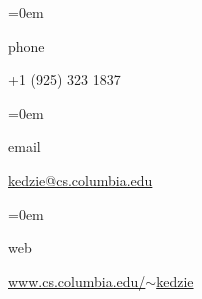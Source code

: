\documentclass{scrartcl}
\newcommand{\NewEntry}[2]{\noindent\hangindent=0em\hangafter=0 \parbox{4em}{\small #1} #2 
\vspace{0.35em}} %
\begin{document}
\thispagestyle{empty} %


\begin{cv}{}\vspace{0.5em} %

\noindent{}\vspace{0.5em} 

\NewEntry{phone}{+1 (925) 323 1837}

\NewEntry{email}{\href{mailto:kedzie@cs.columbia.edu}{kedzie@cs.columbia.edu}}

\NewEntry{web}{\href{http://www.cs.columbia.edu/~kedzie}{www.cs.columbia.edu/$\sim$kedzie}}


\end{cv}
\end{document}
